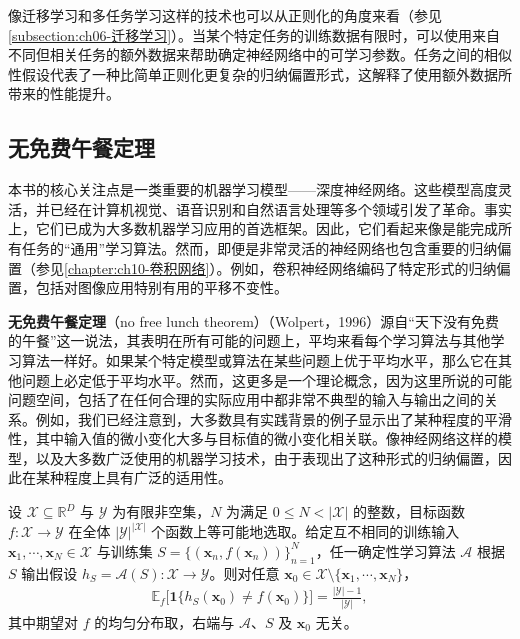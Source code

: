 \documentclass[../../main.tex]{subfiles}
\begin{document}
像迁移学习和多任务学习这样的技术也可以从正则化的角度来看（参见\cref{subsection:ch06-迁移学习}）。当某个特定任务的训练数据有限时，可以使用来自不同但相关任务的额外数据来帮助确定神经网络中的可学习参数。任务之间的相似性假设代表了一种比简单正则化更复杂的归纳偏置形式，这解释了使用额外数据所带来的性能提升。

\subsection{无免费午餐定理}\label{subsection:ch09-无免费午餐}

本书的核心关注点是一类重要的机器学习模型——深度神经网络。这些模型高度灵活，并已经在计算机视觉、语音识别和自然语言处理等多个领域引发了革命。事实上，它们已成为大多数机器学习应用的首选框架。因此，它们看起来像是能完成所有任务的“通用”学习算法。然而，即便是非常灵活的神经网络也包含重要的归纳偏置（参见\cref{chapter:ch10-卷积网络}）。例如，卷积神经网络编码了特定形式的归纳偏置，包括对图像应用特别有用的平移不变性。

\textbf{无免费午餐定理}（no free lunch theorem）（Wolpert，1996）源自“天下没有免费的午餐”这一说法，其表明在所有可能的问题上，平均来看每个学习算法与其他学习算法一样好。如果某个特定模型或算法在某些问题上优于平均水平，那么它在其他问题上必定低于平均水平。然而，这更多是一个理论概念，因为这里所说的可能问题空间，包括了在任何合理的实际应用中都非常不典型的输入与输出之间的关系。例如，我们已经注意到，大多数具有实践背景的例子显示出了某种程度的平滑性，其中输入值的微小变化大多与目标值的微小变化相关联。像神经网络这样的模型，以及大多数广泛使用的机器学习技术，由于表现出了这种形式的归纳偏置，因此在某种程度上具有广泛的适用性。

\begin{theorem}[无免费午餐定理]\label{theorem:ch09-无免费午餐}
设 $\mathcal{X}\subseteq\mathbb{R}^{D}$ 与 $\mathcal{Y}$ 为有限非空集，$N$ 为满足 $0\leqslant N<|\mathcal{X}|$ 的整数，目标函数 $f:\mathcal{X}\to\mathcal{Y}$ 在全体 $|\mathcal{Y}|^{|\mathcal{X}|}$ 个函数上等可能地选取。给定互不相同的训练输入 $\boldsymbol{x}_{1},\cdots,\boldsymbol{x}_{N}\in\mathcal{X}$ 与训练集 $S=\{(\boldsymbol{x}_{n},f(\boldsymbol{x}_{n}))\}_{n=1}^{N}$，任一确定性学习算法 $\mathcal{A}$ 根据 $S$ 输出假设 $h_{S}=\mathcal{A}(S):\mathcal{X}\to\mathcal{Y}$。则对任意 $\boldsymbol{x}_{0}\in\mathcal{X}\setminus\{\boldsymbol{x}_{1},\cdots,\boldsymbol{x}_{N}\}$，
\begin{align*}
\mathbb{E}_{f}\bigl[\mathbf{1}\{h_{S}(\boldsymbol{x}_{0})\neq f(\boldsymbol{x}_{0})\}\bigr]=\frac{|\mathcal{Y}|-1}{|\mathcal{Y}|},
\end{align*}
其中期望对 $f$ 的均匀分布取，右端与 $\mathcal{A}$、$S$ 及 $\boldsymbol{x}_{0}$ 无关。
\end{theorem}
\end{document}
